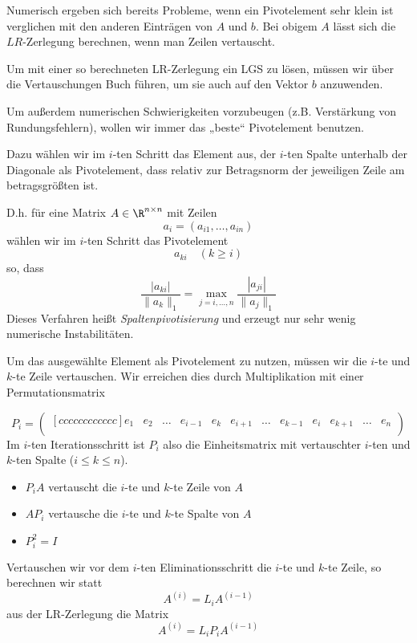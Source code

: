\documentclass[a4paper]{scrartcl}
\numberwithin{equation}{section}
\begin{document}
Numerisch ergeben sich bereits Probleme, wenn ein Pivotelement sehr klein ist verglichen mit den anderen Einträgen von $A$ und $b$.
Bei obigem $A$ lässt sich die $LR$-Zerlegung berechnen, wenn man Zeilen vertauscht.

Um mit einer so berechneten LR-Zerlegung ein LGS zu lösen, müssen wir über die Vertauschungen Buch führen, um sie auch auf den Vektor $b$ anzuwenden.

Um außerdem numerischen Schwierigkeiten vorzubeugen (z.B. Verstärkung von Rundungsfehlern), wollen wir immer das „beste“ Pivotelement benutzen.

Dazu wählen wir im $i$-ten Schritt das Element aus, der $i$-ten Spalte unterhalb der Diagonale als Pivotelement, dass relativ zur Betragsnorm der jeweiligen Zeile am betragsgrößten ist.

D.h. für eine Matrix $A\in \R^{n\times n}$ mit Zeilen
\[
	a_i = (a_{i1}, \dotsc, a_{in})
\]
wählen wir im $i$-ten Schritt das Pivotelement
\[
a_{ki} \quad (k\ge i)
\]
so, dass
\[
\frac {|a_{ki}|}{\|a_k\|_1} = \max_{j=i,\dotsc,n}\frac{|a_{ji}|}{\|a_j\|_1}
\]
Dieses Verfahren heißt \emph{Spaltenpivotisierung} und erzeugt nur sehr wenig numerische Instabilitäten.

Um das ausgewählte Element als Pivotelement zu nutzen, müssen wir die $i$-te und $k$-te Zeile vertauschen.
Wir erreichen dies durch Multiplikation mit einer Permutationsmatrix

\begin{equation}
\label{eq:3.5}
P_i = \begin{pmatrix}[cccccccccccc]
e_1 & e_2 & \dotsc & e_{i-1} & e_k & e_{i+1} & \dotsc & e_{k-1} & e_i & e_{k+1} & \dotsc & e_n \\
\end{pmatrix}
\end{equation}
Im $i$-ten Iterationsschritt ist $P_i$ also die Einheitsmatrix mit vertauschter $i$-ten und $k$-ten Spalte ($i\le k\le n$).
\begin{itemize}
\item $P_i A$ vertauscht die $i$-te und $k$-te Zeile von $A$
\item $A P_i$ vertausche die $i$-te und $k$-te Spalte von $A$
\item $P_i^2 = I$ 
\end{itemize}

Vertauschen wir vor dem $i$-ten Eliminationsschritt die $i$-te und $k$-te Zeile, so berechnen wir statt
\[
A^{(i)} = L_i A^{(i-1)} 
\]
aus der LR-Zerlegung die Matrix
\[
A^{(i)} = L_i P_i A^{(i-1)}
\]
\end{document}
